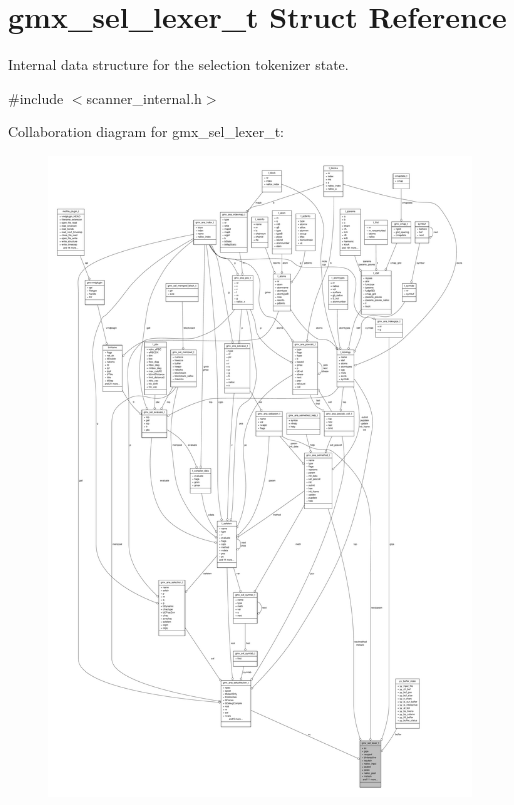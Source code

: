 \hypertarget{structgmx__sel__lexer__t}{\section{gmx\-\_\-sel\-\_\-lexer\-\_\-t \-Struct \-Reference}
\label{structgmx__sel__lexer__t}
}


\-Internal data structure for the selection tokenizer state.  




{\ttfamily \#include $<$scanner\-\_\-internal.\-h$>$}



\-Collaboration diagram for gmx\-\_\-sel\-\_\-lexer\-\_\-t\-:
\nopagebreak
\begin{figure}[H]
\begin{center}
\leavevmode
\includegraphics[width=350pt]{structgmx__sel__lexer__t__coll__graph}
\end{center}
\end{figure}
